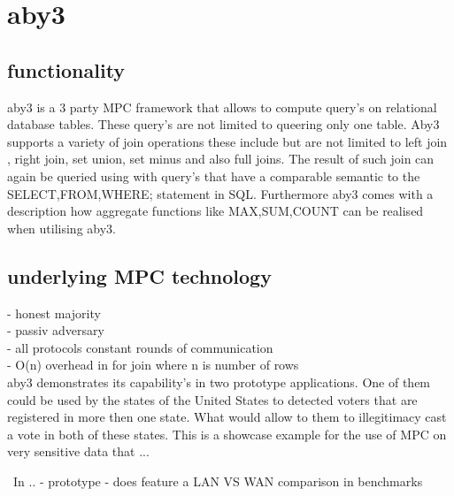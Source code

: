\section{aby3}


\subsection{functionality }
aby3 is a 3 party MPC framework that allows to compute query's on relational database tables. These query's are not limited to queering only one table. Aby3 supports a variety of join operations these include but are not limited to  left join , right join, set union, set minus and also full joins. The result of such join can again be queried using with query's that have a comparable semantic to the SELECT,FROM,WHERE; statement in SQL. Furthermore aby3 comes with a description how aggregate functions like MAX,SUM,COUNT can be realised when utilising aby3.

\subsection{underlying MPC technology}
- honest majority \\ 
- passiv adversary \\
- all protocols constant rounds of communication \\
- O(n) overhead in for join where n is number of rows \\


aby3 demonstrates its capability's in two prototype applications. One of them could be used by the states of the United States to detected voters that are registered in more then one state. What would allow to them to illegitimacy cast a vote in both of these states. This is a showcase example for the use of MPC on very sensitive data that ...




\
In \cite{10.1145/3372297.3423358} ..
-  prototype 
- does feature a LAN VS WAN comparison in benchmarks

  